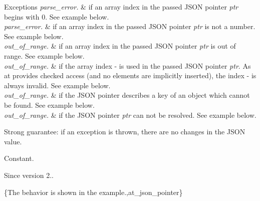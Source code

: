 \begin{DoxyExceptions}{Exceptions}
{\em parse\+\_\+error.} & if an array index in the passed J\+S\+ON pointer {\itshape ptr} begins with \textquotesingle{}0\textquotesingle{}. See example below.\\
\hline
{\em parse\+\_\+error.} & if an array index in the passed J\+S\+ON pointer {\itshape ptr} is not a number. See example below.\\
\hline
{\em out\+\_\+of\+\_\+range.} & if an array index in the passed J\+S\+ON pointer {\itshape ptr} is out of range. See example below.\\
\hline
{\em out\+\_\+of\+\_\+range.} & if the array index \textquotesingle{}-\/\textquotesingle{} is used in the passed J\+S\+ON pointer {\itshape ptr}. As {\ttfamily at} provides checked access (and no elements are implicitly inserted), the index \textquotesingle{}-\/\textquotesingle{} is always invalid. See example below.\\
\hline
{\em out\+\_\+of\+\_\+range.} & if the J\+S\+ON pointer describes a key of an object which cannot be found. See example below.\\
\hline
{\em out\+\_\+of\+\_\+range.} & if the J\+S\+ON pointer {\itshape ptr} can not be resolved. See example below.\\
\hline
\end{DoxyExceptions}
Strong guarantee\+: if an exception is thrown, there are no changes in the J\+S\+ON value.

Constant.

\begin{DoxySince}{Since}
version 2..
\end{DoxySince}
\{The behavior is shown in the example.,at\+\_\+json\+\_\+pointer\} \mbox{\label{classnlohmann_1_1basic__json_a7479d686148c26e252781bb32aa5d5c9}} 
